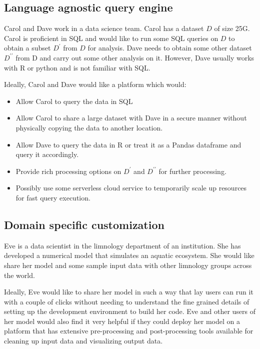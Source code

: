 \subsection{Language agnostic query engine}
Carol and Dave work in a data science team. Carol has a dataset $D$ of size 25G. Carol is proficient in 
SQL and would like to run some SQL queries on $D$ to obtain a subset $D^\prime$ from $D$ for analysis.
Dave needs to obtain some other dataset $D^{\prime \prime}$ from D and carry out some other analysis on
it. However, Dave usually works with R or python and is not familiar with SQL.

Ideally, Carol and Dave would like a platform which would:
\begin{itemize}
  \item Allow Carol to query the data in SQL
  \item Allow Carol to share a large dataset with Dave in a secure manner without physically copying the
    data to another location.
  \item Allow Dave to query the data in R or treat it as a Pandas dataframe and query it accordingly.
  \item Provide rich processing options on $D^\prime$ and $D^{\prime \prime}$ for further processing.
  \item Possibly use some serverless cloud service to temporarily scale up resources for fast query 
    execution.
\end{itemize}

\subsection{Domain specific customization}
Eve is a data scientist in the limnology department of an institution. She has developed a numerical
model that simulates an aquatic ecosystem. She would like share her model and some sample input data
with other limnology groups across the world.

Ideally, Eve would like to share her model in such a way that lay users can run it with a couple of
clicks without needing to understand the fine grained details of setting up the development 
environment to build her code. Eve and other users of her model would also find it very helpful if 
they could deploy her model on a platform that has extensive pre-processing and post-processing tools
available for cleaning up input data and visualizing output data.
